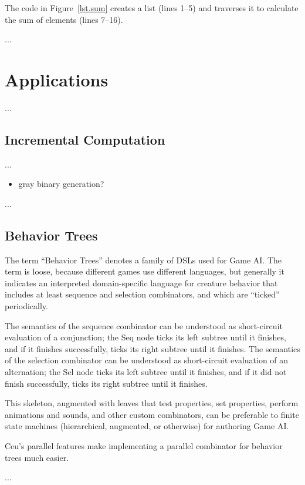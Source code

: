 \documentclass{acm_proc_article-sp}
\begin{document}
The code in Figure~\ref{lst.sum} creates a list (lines 1--5) and traverses it 
to calculate the sum of elements (lines 7--16).

...

\section{Applications}

...

\subsection{Incremental Computation}

...

\begin{itemize}
\item gray binary generation?
\end{itemize}

...

\subsection{Behavior Trees}

The term ``Behavior Trees'' denotes a family of DSLs 
used for Game AI.
The term is loose, because different games use different languages,
but generally it indicates an interpreted domain-specific language
for creature behavior that includes at least sequence and selection combinators,
and which are ``ticked'' periodically.

The semantics of the sequence combinator can be understood as short-circuit evaluation of a conjunction;
the Seq node ticks its left subtree until it finishes,
and if it finishes successfully, ticks its right subtree until it finishes.
The semantics of the selection combinator can be understood as short-circuit evaluation of an alternation;
the Sel node ticks its left subtree until it finishes,
and if it did not finish successfully, ticks its right subtree until it finishes.

This skeleton, augmented with leaves that test properties, set properties, perform animations and sounds,
and other custom combinators, can be preferable to finite state machines (hierarchical, augmented, or otherwise) for authoring Game AI.

Ceu's parallel features make implementing a parallel combinator for behavior trees much easier.

...
\end{document}
